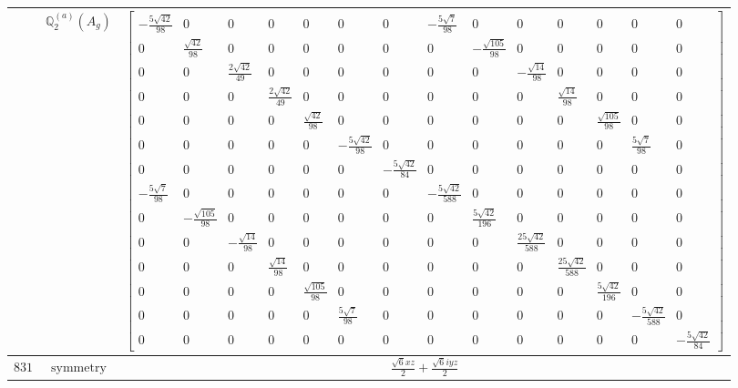 \documentclass[fleqn,8pt,landscape]{jsarticle}
\begin{document}
\begin{longtable}{ccc}
$  $ & $ \mathbb{Q}_{2}^{(a)}(A_{g}) $ & $ \begin{bmatrix} - \frac{5 \sqrt{42}}{98} & 0 & 0 & 0 & 0 & 0 & 0 & - \frac{5 \sqrt{7}}{98} & 0 & 0 & 0 & 0 & 0 & 0 \\ 0 & \frac{\sqrt{42}}{98} & 0 & 0 & 0 & 0 & 0 & 0 & - \frac{\sqrt{105}}{98} & 0 & 0 & 0 & 0 & 0 \\ 0 & 0 & \frac{2 \sqrt{42}}{49} & 0 & 0 & 0 & 0 & 0 & 0 & - \frac{\sqrt{14}}{98} & 0 & 0 & 0 & 0 \\ 0 & 0 & 0 & \frac{2 \sqrt{42}}{49} & 0 & 0 & 0 & 0 & 0 & 0 & \frac{\sqrt{14}}{98} & 0 & 0 & 0 \\ 0 & 0 & 0 & 0 & \frac{\sqrt{42}}{98} & 0 & 0 & 0 & 0 & 0 & 0 & \frac{\sqrt{105}}{98} & 0 & 0 \\ 0 & 0 & 0 & 0 & 0 & - \frac{5 \sqrt{42}}{98} & 0 & 0 & 0 & 0 & 0 & 0 & \frac{5 \sqrt{7}}{98} & 0 \\ 0 & 0 & 0 & 0 & 0 & 0 & - \frac{5 \sqrt{42}}{84} & 0 & 0 & 0 & 0 & 0 & 0 & 0 \\ - \frac{5 \sqrt{7}}{98} & 0 & 0 & 0 & 0 & 0 & 0 & - \frac{5 \sqrt{42}}{588} & 0 & 0 & 0 & 0 & 0 & 0 \\ 0 & - \frac{\sqrt{105}}{98} & 0 & 0 & 0 & 0 & 0 & 0 & \frac{5 \sqrt{42}}{196} & 0 & 0 & 0 & 0 & 0 \\ 0 & 0 & - \frac{\sqrt{14}}{98} & 0 & 0 & 0 & 0 & 0 & 0 & \frac{25 \sqrt{42}}{588} & 0 & 0 & 0 & 0 \\ 0 & 0 & 0 & \frac{\sqrt{14}}{98} & 0 & 0 & 0 & 0 & 0 & 0 & \frac{25 \sqrt{42}}{588} & 0 & 0 & 0 \\ 0 & 0 & 0 & 0 & \frac{\sqrt{105}}{98} & 0 & 0 & 0 & 0 & 0 & 0 & \frac{5 \sqrt{42}}{196} & 0 & 0 \\ 0 & 0 & 0 & 0 & 0 & \frac{5 \sqrt{7}}{98} & 0 & 0 & 0 & 0 & 0 & 0 & - \frac{5 \sqrt{42}}{588} & 0 \\ 0 & 0 & 0 & 0 & 0 & 0 & 0 & 0 & 0 & 0 & 0 & 0 & 0 & - \frac{5 \sqrt{42}}{84} \end{bmatrix} $ \\ \hline
$ 831 $ & $ \text{symmetry} $ & $ \frac{\sqrt{6} x z}{2} + \frac{\sqrt{6} i y z}{2} $ \\

\end{longtable}
\end{document}

